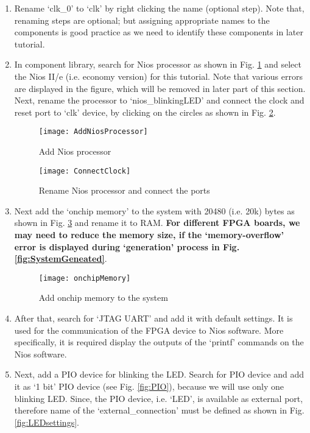 \begin{enumerate}
	\item Rename `clk\_0' to `clk' by right clicking the name (optional step). Note that, renaming steps are optional; but assigning appropriate names to the components is good practice as we need to identify these components in later tutorial. 
	\item In component library, search for Nios processor as shown in Fig. \ref{fig:AddNiosProcessor} and select the Nios II/e (i.e. economy version) for this tutorial. Note that various errors are displayed in the figure, which will be removed in later part of this section. Next, rename the processor to `nios\_blinkingLED' and  connect the clock and reset port to `clk' device, by clicking on the circles as shown in Fig. \ref{fig:ConnectClock}. 
	
	\begin{figure}[!h]
		\centering
		\texttt{[image: AddNiosProcessor]}
		\caption{Add Nios processor}
		\label{fig:AddNiosProcessor}
	\end{figure}
	
	\begin{figure}[!h]
		\centering
		\texttt{[image: ConnectClock]}
		\caption{Rename Nios processor and connect the ports}
		\label{fig:ConnectClock}
	\end{figure}
	
	\item Next add the `onchip memory' to the system with 20480 (i.e. 20k) bytes as shown in Fig. \ref{fig:onchipMemory} and rename it to RAM. \textbf{For different FPGA boards, we may need to reduce the memory size, if the `memory-overflow' error is displayed during `generation' process in Fig. \ref{fig:SystemGeneated}}.
	
	\begin{figure}[!h]
		\centering
		\texttt{[image: onchipMemory]}
		\caption{Add onchip memory to the system}
		\label{fig:onchipMemory}
	\end{figure}
	
	\item After that, search for `JTAG UART' and add it with default settings. It is used for the communication of the FPGA device to Nios software. More specifically, it is required display the outputs of the `printf' commands on the Nios software. 
	
	\item Next, add a PIO device for blinking the LED. Search for PIO device and add it as `1 bit' PIO device (see Fig. \ref{fig:PIO}), because we will use only one blinking LED. Since, the PIO device, i.e. `LED', is available as external port, therefore name of the `external\_connection' must be defined as shown in Fig. \ref{fig:LEDsettings}. 
	

\end{enumerate}
